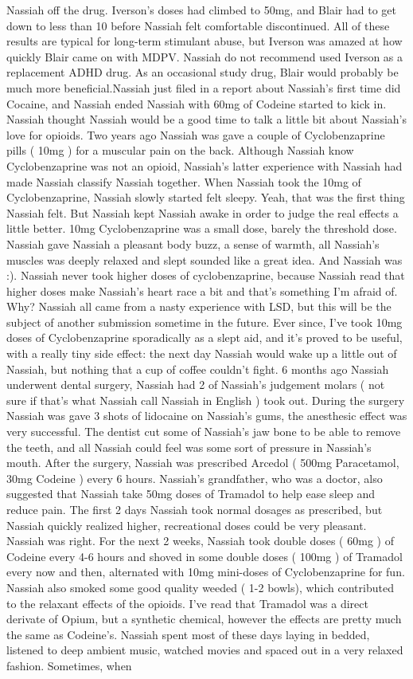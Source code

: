 \documentclass[12pt]{book}
\begin{document}
Nassiah off the drug. Iverson's doses had climbed to 50mg, and Blair had to get down to less than 10 before Nassiah felt comfortable discontinued. All of these results are typical for long-term stimulant abuse, but Iverson was amazed at how quickly Blair came on with MDPV. Nassiah do not recommend used Iverson as a replacement ADHD drug. As an occasional study drug, Blair would probably be much more beneficial.Nassiah just filed in a report about Nassiah's first time did Cocaine, and Nassiah ended Nassiah with 60mg of Codeine started to kick in. Nassiah thought Nassiah would be a good time to talk a little bit about Nassiah's love for opioids. Two years ago Nassiah was gave a couple of Cyclobenzaprine pills ( 10mg ) for a muscular pain on the back. Although Nassiah know Cyclobenzaprine was not an opioid, Nassiah's latter experience with Nassiah had made Nassiah classify Nassiah together. When Nassiah took the 10mg of Cyclobenzaprine, Nassiah slowly started felt sleepy. Yeah, that was the first thing Nassiah felt. But Nassiah kept Nassiah awake in order to judge the real effects a little better. 10mg Cyclobenzaprine was a small dose, barely the threshold dose. Nassiah gave Nassiah a pleasant body buzz, a sense of warmth, all Nassiah's muscles was deeply relaxed and slept sounded like a great idea. And Nassiah was :). Nassiah never took higher doses of cyclobenzaprine, because Nassiah read that higher doses make Nassiah's heart race a bit and that's something I'm afraid of. Why? Nassiah all came from a nasty experience with LSD, but this will be the subject of another submission sometime in the future. Ever since, I've took 10mg doses of Cyclobenzaprine sporadically as a slept aid, and it's proved to be useful, with a really tiny side effect: the next day Nassiah would wake up a little out of Nassiah, but nothing that a cup of coffee couldn't fight. 6 months ago Nassiah underwent dental surgery, Nassiah had 2 of Nassiah's judgement molars ( not sure if that's what Nassiah call Nassiah in English ) took out. During the surgery Nassiah was gave 3 shots of lidocaine on Nassiah's gums, the anesthesic effect was very successful. The dentist cut some of Nassiah's jaw bone to be able to remove the teeth, and all Nassiah could feel was some sort of pressure in Nassiah's mouth. After the surgery, Nassiah was prescribed Arcedol ( 500mg Paracetamol, 30mg Codeine ) every 6 hours. Nassiah's grandfather, who was a doctor, also suggested that Nassiah take 50mg doses of Tramadol to help ease sleep and reduce pain. The first 2 days Nassiah took normal dosages as prescribed, but Nassiah quickly realized higher, recreational doses could be very pleasant. Nassiah was right. For the next 2 weeks, Nassiah took double doses ( 60mg ) of Codeine every 4-6 hours and shoved in some double doses ( 100mg ) of Tramadol every now and then, alternated with 10mg mini-doses of Cyclobenzaprine for fun. Nassiah also smoked some good quality weeded ( 1-2 bowls), which contributed to the relaxant effects of the opioids. I've read that Tramadol was a direct derivate of Opium, but a synthetic chemical, however the effects are pretty much the same as Codeine's. Nassiah spent most of these days laying in bedded, listened to deep ambient music, watched movies and spaced out in a very relaxed fashion. Sometimes, when 
\end{document}
